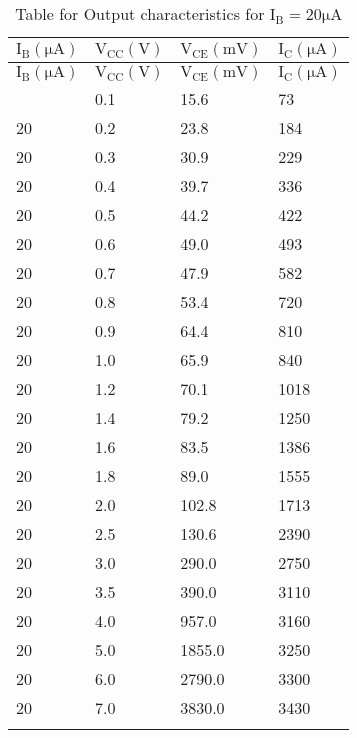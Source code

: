 \documentclass[12pt]{article}
\begin{document}
\begin{longtable}{|l|l|l|l|}
	\hline
    $\mathrm{I_{B}(\mu A)}$ & $\mathrm{V_{CC}(V)}$ & $\mathrm{V_{CE}(mV)}$&  $\mathrm{I_{C}(\mu A)}$ \\ \hline
	\endfirsthead
	\hline
    $\mathrm{I_{B}(\mu A)}$ & $\mathrm{V_{CC}(V)}$& $\mathrm{V_{CE}(mV)}$&  $\mathrm{I_{C}(\mu A)}$ \\ \hline
	\endhead
	\hline
	\endfoot
	\endlastfoot
    20  & 0.1  & 15.6  & 73   \\ \hline
    20  & 0.2  & 23.8  & 184  \\ \hline
    20  & 0.3  & 30.9  & 229  \\ \hline
    20  & 0.4  & 39.7  & 336  \\ \hline
    20  & 0.5  & 44.2  & 422  \\ \hline
    20  & 0.6  & 49.0  & 493  \\ \hline
    20  & 0.7  & 47.9  & 582  \\ \hline
    20  & 0.8  & 53.4  & 720  \\ \hline
    20  & 0.9  & 64.4  & 810  \\ \hline
    20  & 1.0  & 65.9  & 840  \\ \hline
    20  & 1.2  & 70.1  & 1018 \\ \hline
    20  & 1.4  & 79.2  & 1250 \\ \hline
    20  & 1.6  & 83.5  & 1386 \\ \hline
    20  & 1.8  & 89.0  & 1555 \\ \hline
    20  & 2.0  & 102.8 & 1713 \\ \hline
    20  & 2.5  & 130.6 & 2390 \\ \hline
    20  & 3.0  & 290.0 & 2750 \\ \hline
    20  & 3.5  & 390.0 & 3110 \\ \hline
    20  & 4.0  & 957.0 & 3160 \\ \hline
    20  & 5.0  & 1855.0 & 3250 \\ \hline
    20  & 6.0  & 2790.0 & 3300 \\ \hline
    20  & 7.0  & 3830.0 & 3430 \\ \hline
\caption{Table for Output characteristics for $\mathrm{I_B=20 \mu A}$}
\end{longtable}
\end{document}

